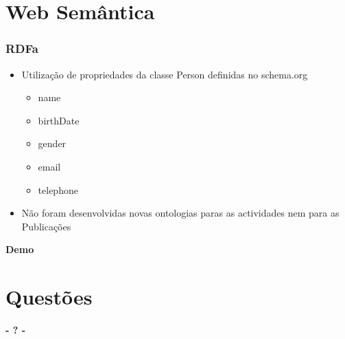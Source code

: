 \documentclass{beamer}
\begin{document}
\section{Web Semântica}
\begin{frame}
	\frametitle{RDFa}
	\begin{itemize}
		\item Utilização de propriedades da classe Person definidas no schema.org
		\begin{itemize}
			\item name
			\item birthDate
			\item gender
			\item email
			\item telephone
		\end{itemize}
		\item Não foram desenvolvidas novas ontologias paras as actividades nem para as Publicações
	\end{itemize}
\end{frame}


\begin{frame}
	\begin{center}
		\Huge\bfseries
		Demo
	\end{center}
\end{frame}

\section{Questões}
\begin{frame}
\titlepage
	\begin{center}
		\Huge\bfseries
		- ? -
	\end{center}
\end{frame}
\end{document}
